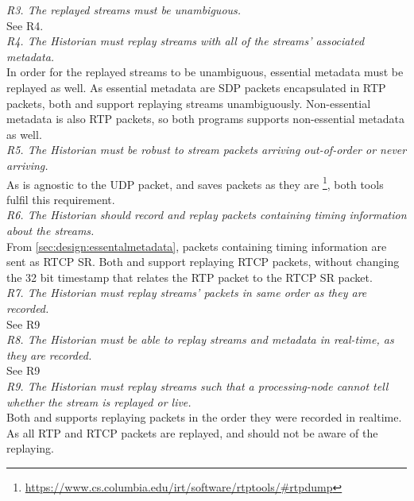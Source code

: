 \noindent{}\textit{R3. The replayed streams must be unambiguous.}\\
See R4.\\

\noindent{}\textit{R4. The Historian must replay streams with all of the streams’ associated metadata.}\\
In order for the replayed streams to be unambiguous, essential metadata must be replayed as well. As essential metadata are SDP packets encapsulated in RTP packets, both  and  support replaying streams unambiguously. Non-essential metadata is also RTP packets, so both programs supports non-essential metadata as well.\\

\noindent{}\textit{R5. The Historian must be robust to stream packets arriving out-of-order or never arriving.}\\
As  is agnostic to the UDP packet, and  saves packets as they are \footnote{\url{https://www.cs.columbia.edu/irt/software/rtptools/\#rtpdump}}, both tools fulfil this requirement.\\

\noindent{}\textit{R6. The Historian should record and replay packets containing timing information about the streams.}\\
From \ref{sec:design:essentalmetadata}, packets containing timing information are sent as RTCP SR.
Both  and  support replaying RTCP packets, without changing the 32 bit timestamp that relates the RTP packet to the RTCP SR packet.\\

\noindent{}\textit{R7. The Historian must replay streams’ packets in same order as they are recorded.}\\
See R9\\

\noindent{}\textit{R8. The Historian must be able to replay streams and metadata in real-time, as they are recorded.}\\
See R9\\

\noindent{}\textit{R9. The Historian must replay streams such that a processing-node cannot tell whether the stream is replayed or live.}\\
Both  and  supports replaying packets in the order they were recorded in realtime. As all RTP and RTCP packets are replayed, \subs{} and \pubs{} should not be aware of the replaying.\\

